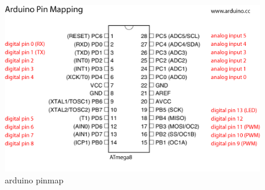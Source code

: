 \begin{figure}[!htb]
 \centering
 \includegraphics[scale=0.3]{img/arduino_breadboard/arduino_pinmap.png}
 \caption{arduino pinmap}
 \label{arduino pinmap}
\end{figure}


